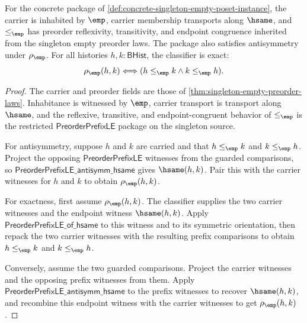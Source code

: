 \begin{theorem}
\label{thm:singleton-empty-poset-laws}
For the concrete package of
\autoref{def:concrete-singleton-empty-poset-instance}, the carrier is
inhabited by $\emp$, carrier membership transports along $\hsame$, and
$\le_{\emp}$ has preorder reflexivity, transitivity, and endpoint congruence
inherited from the singleton empty preorder laws. The package also satisfies
antisymmetry under $\rho_{\emp}$. For all histories $h,k:\mathsf{BHist}$, the
classifier is exact:
$$
\rho_{\emp}(h,k)\Longleftrightarrow
(h\le_{\emp}k\land k\le_{\emp}h).
$$
\end{theorem}
\begin{proof}
The carrier and preorder fields are those of
\autoref{thm:singleton-empty-preorder-laws}. Inhabitance is witnessed by
$\emp$, carrier transport is transport along $\hsame$, and the reflexive,
transitive, and endpoint-congruent behavior of $\le_{\emp}$ is the restricted
$\mathsf{PreorderPrefixLE}$ package on the singleton source.

For antisymmetry, suppose $h$ and $k$ are carried and that
$h\le_{\emp}k$ and $k\le_{\emp}h$. Project the opposing
$\mathsf{PreorderPrefixLE}$ witnesses from the guarded comparisons, so
$\mathsf{PreorderPrefixLE\_antisymm\_hsame}$ gives $\hsame(h,k)$. Pair this
with the carrier witnesses for $h$ and $k$ to obtain $\rho_{\emp}(h,k)$.

For exactness, first assume $\rho_{\emp}(h,k)$. The classifier supplies the
two carrier witnesses and the endpoint witness $\hsame(h,k)$. Apply
$\mathsf{PreorderPrefixLE\_of\_hsame}$ to this witness and to its symmetric
orientation, then repack the two carrier witnesses with the resulting prefix
comparisons to obtain $h\le_{\emp}k$ and $k\le_{\emp}h$.

Conversely, assume the two guarded comparisons. Project the carrier witnesses
and the opposing prefix witnesses from them. Apply
$\mathsf{PreorderPrefixLE\_antisymm\_hsame}$ to the prefix witnesses to recover
$\hsame(h,k)$, and recombine this endpoint witness with the carrier witnesses
to get $\rho_{\emp}(h,k)$.
\end{proof}


